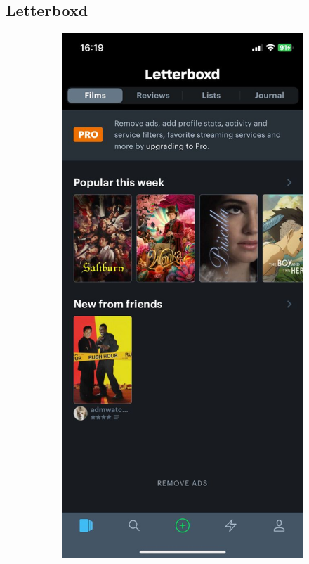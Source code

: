 \subsection{Letterboxd}
\begin{figure} [h]
    \centering
    \begin{subfigure}{.3\linewidth}
      \centering
      \includegraphics[width = \linewidth]{mainmatter/images/letterboxd1.jpg}

\end{subfigure}
\end{figure}
